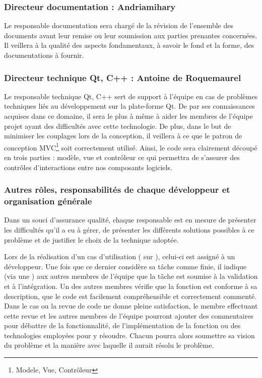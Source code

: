 \subsubsection{Directeur documentation : Andriamihary }
Le responsable documentation sera chargé de la révision de l'ensemble des documents avant leur remise ou leur soumission aux parties prenantes
concernées. Il veillera à la qualité des aspects fondamentaux, à savoir le fond et la forme, des documentations à fournir.

\subsubsection{Directeur technique Qt, C++ : Antoine de Roquemaurel}
Le responsable technique Qt, C++ sert de support à l'équipe en cas de problèmes techniques liés au développement sur la plate-forme Qt. De par ses
connaissances acquises dans ce domaine, il sera le plus à même à aider les membres de l'équipe projet ayant des difficultés avec cette technologie.
De plus, dans le but de minimiser les couplages lors de la conception, il veillera à ce que le patron de conception MVC\footnote{Modele, Vue, Contrôleur} soit correctement utilisé. Ainsi, le code
sera clairement découpé en trois parties : modèle, vue et contrôleur ce qui permettra de s’assurer des contrôles d'interactions entre nos composants
logiciels.

\subsubsection{Autres rôles, responsabilités de chaque développeur et organisation générale}
Dans un souci d’assurance qualité, chaque responsable est en mesure de présenter les difficultés qu'il a eu à gérer, de présenter les différents
solutions possibles à ce problème et de justifier le choix de la technique adoptée.

Lors de la réalisation d’un cas d’utilisation ( sur ), celui-ci est assigné à un développeur. Une fois que ce dernier considère sa
tâche comme finie, il indique (via une ) aux autres membres de l’équipe que la tâche est soumise à la validation et à l'intégration.
Un des autres membres vérifie que la fonction est conforme à sa description, que le code est facilement compréhensible et correctement commenté. Dans
le cas ou la revue de code ne donne pleine satisfaction, le membre effectuant cette revue et les autres membres de l’équipe pourront ajouter des
commentaires pour débattre de la fonctionnalité, de l’implémentation de la fonction ou des technologies employées pour y résoudre. Chacun pourra
alors soumettre sa vision du problème et la manière avec laquelle il aurait résolu le problème. 

